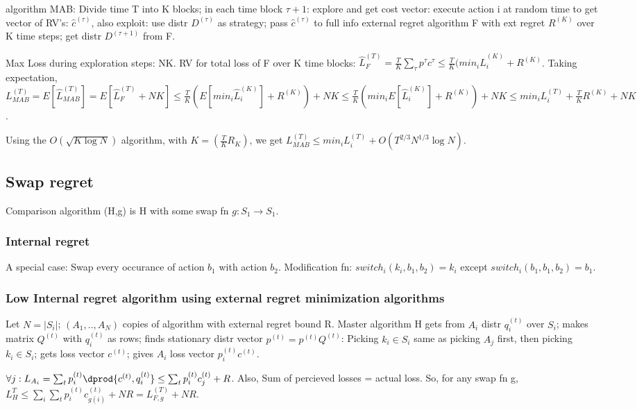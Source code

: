\documentclass[oneside, article]{memoir}
\begin{document}
algorithm MAB: Divide time T into K blocks; in each time block $\tau+1$: explore and get cost vector: execute action i at random time to get vector of RV's: $\hat{c}^{(\tau)}$, also exploit: use distr $D^{(\tau)}$ as strategy; pass $\hat{c}^{(\tau)}$ to full info external regret algorithm F with ext regret $R^{(K)}$ over K time steps; get distr $D^{(\tau + 1)}$ from F.

Max Loss during exploration steps: NK. RV for total loss of F over K time blocks: $\hat{L}_{F}^{(T)} = \frac{T}{K}\sum_{\tau}p^{\tau}c^{\tau} \leq \frac{T}{K}(min_{i} \hat{L}_{i}^{(K)} + R^{(K)}$. Taking expectation, $L_{MAB}^{(T)} = E[\hat{L}_{MAB}^{(T)}]= E[\hat{L}_{F}^{(T)} + NK] \leq \frac{T}{K}(E[min_{i} \hat{L}_{i}^{(K)}] + R^{(K)}) + NK \leq \frac{T}{K}(min_{i} E[\hat{L}_{i}^{(K)}] + R^{(K)}) + NK \leq min_{i}L_{i}^{(T)} + \frac{T}{K}R^{(K)} + NK$.

Using the $O(\sqrt{K\log N})$ algorithm, with $K=(\frac{T}{K}R_{K})$, we get $L_{MAB}^{(T)} \leq min_{i}L_{i}^{(T)} + O(T^{2/3}N^{1/3}\log N)$.

\subsection{Swap regret}
Comparison algorithm (H,g) is H with some swap fn $g:S_{1} \to S_{1}$.

\subsubsection{Internal regret}
A special case: Swap every occurance of action $b_{1}$ with action $b_{2}$. Modification fn: $switch_{i}(k_{i},b_{1}, b_{2}) = k_{i}$ except $switch_{i}(b_{1},b_{1}, b_{2}) = b_{1}$.

\subsubsection{Low Internal regret algorithm using external regret minimization algorithms}
Let $N=|S_{i}|$; $(A_{1}, .., A_{N})$ copies of algorithm with external regret bound R. Master algorithm H gets from $A_{i}$ distr $q_{i}^{(t)}$ over $S_{i}$; makes matrix $Q^{(t)}$ with $q_{i}^{(t)}$ as rows; finds stationary distr vector $p^{(t)} = p^{(t)}Q^{(t)}$: Picking $k_{i} \in S_{i}$ same as picking $A_{j}$ first, then picking $k_{i} \in S_{i}$; gets loss vector $c^{(t)}$; gives $A_{i}$ loss vector $p_{i}^{(t)}c^{(t)}$.

$\forall j: L_{A_{i}} = \sum_{t} p_{i}^{(t)}\dprod{c^{(t)},q_{i}^{(t)}} \leq \sum_{t} p_{i}^{(t)}c_{j}^{(t)} + R$. Also, Sum of percieved losses = actual loss. So, for any swap fn g, $L_{H}^{T}\leq \sum_{i}\sum_{t} p_{i}^{(t)}c_{g(i)}^{(t)} + NR = L_{F,g}^{(T)} + NR$.
\end{document}
